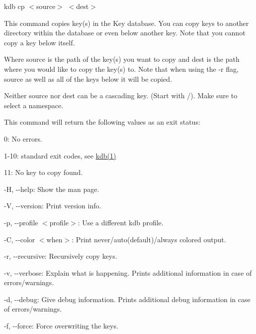 {\ttfamily kdb cp $<$source$>$ $<$dest$>$}

This command copies key(s) in the Key database. You can copy keys to another directory within the database or even below another key. Note that you cannot copy a key below itself.

Where {\ttfamily source} is the path of the key(s) you want to copy and {\ttfamily dest} is the path where you would like to copy the key(s) to. Note that when using the {\ttfamily -\/r} flag, {\ttfamily source} as well as all of the keys below it will be copied.

Neither {\ttfamily source} nor {\ttfamily dest} can be a cascading key. (Start with {\ttfamily /}). Make sure to select a namespace.

This command will return the following values as an exit status\+:


\begin{DoxyItemize}
\item 0\+: No errors.
\item 1-\/10\+: standard exit codes, see \hyperlink{doc_help_kdb_md}{kdb(1)}
\item 11\+: No key to copy found.
\end{DoxyItemize}


\begin{DoxyItemize}
\item {\ttfamily -\/H}, {\ttfamily -\/-\/help}\+: Show the man page.
\item {\ttfamily -\/V}, {\ttfamily -\/-\/version}\+: Print version info.
\item {\ttfamily -\/p}, {\ttfamily -\/-\/profile $<$profile$>$}\+: Use a different kdb profile.
\item {\ttfamily -\/C}, {\ttfamily -\/-\/color $<$when$>$}\+: Print never/auto(default)/always colored output.
\item {\ttfamily -\/r}, {\ttfamily -\/-\/recursive}\+: Recursively copy keys.
\item {\ttfamily -\/v}, {\ttfamily -\/-\/verbose}\+: Explain what is happening. Prints additional information in case of errors/warnings.
\item {\ttfamily -\/d}, {\ttfamily -\/-\/debug}\+: Give debug information. Prints additional debug information in case of errors/warnings.
\item {\ttfamily -\/f}, {\ttfamily -\/-\/force}\+: Force overwriting the keys.
\end{DoxyItemize}


